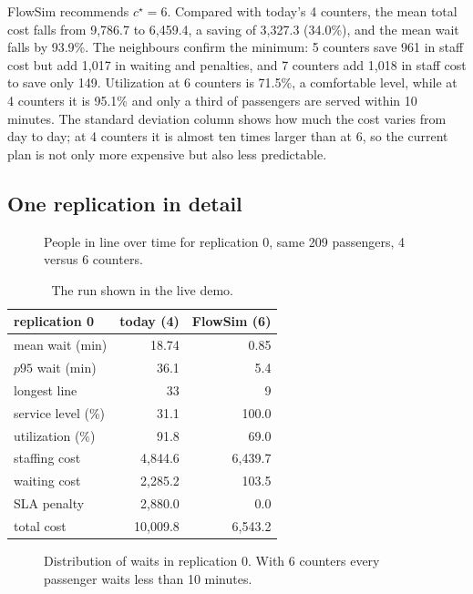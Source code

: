 \documentclass[11pt,a4paper]{article}
\begin{document}
FlowSim recommends $c^\star=6$. Compared with today's 4 counters, the mean total cost falls from 9{,}786.7 to 6{,}459.4,
a saving of 3{,}327.3 (34.0\%), and the mean wait falls by 93.9\%. The neighbours confirm the minimum: 5 counters save
961 in staff cost but add 1{,}017 in waiting and penalties, and 7 counters add 1{,}018 in staff cost to save only 149.
Utilization at 6 counters is 71.5\%, a comfortable level, while at 4 counters it is 95.1\% and only a third of passengers
are served within 10 minutes. The standard deviation column shows how much the cost varies from day to day; at 4
counters it is almost ten times larger than at 6, so the current plan is not only more expensive but also less
predictable.

\subsection{One replication in detail}
\begin{figure}[H]\centering{}
\caption{People in line over time for replication 0, same 209 passengers, 4 versus 6 counters.}\end{figure}

\begin{table}[H]\centering\small
\begin{tabular}{@{}lrr@{}}\toprule replication 0 & today (4) & FlowSim (6)\\\midrule
mean wait (min) & 18.74 & 0.85\\ $p95$ wait (min) & 36.1 & 5.4\\ longest line & 33 & 9\\ service level (\%) & 31.1 & 100.0\\
utilization (\%) & 91.8 & 69.0\\ staffing cost & 4{,}844.6 & 6{,}439.7\\ waiting cost & 2{,}285.2 & 103.5\\
SLA penalty & 2{,}880.0 & 0.0\\ total cost & 10{,}009.8 & 6{,}543.2\\\bottomrule\end{tabular}
\caption{The run shown in the live demo.}\end{table}

\begin{figure}[H]\centering
{}
\caption{Distribution of waits in replication 0. With 6 counters every passenger waits less than 10 minutes.}
\end{figure}
\end{document}
